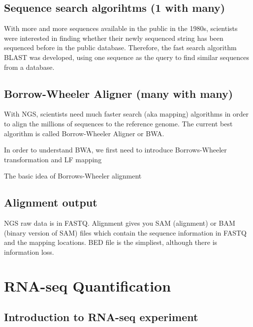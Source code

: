 \documentclass[
]{book}
\begin{document}
\hypertarget{sequence-search-algorihtms-1-with-many}{%
\section{Sequence search algorihtms (1 with many)}\label{sequence-search-algorihtms-1-with-many}}

With more and more sequences available in the public in the 1980s, scientists were interested in finding whether their newly sequenced string has been sequenced before in the public database. Therefore, the fast search algorithm BLAST was developed, using one sequence as the query to find similar sequences from a database.

\hypertarget{borrow-wheeler-aligner-many-with-many}{%
\section{Borrow-Wheeler Aligner (many with many)}\label{borrow-wheeler-aligner-many-with-many}}

With NGS, scientists need much faster search (aka mapping) algorithms in order to align the millions of sequences to the reference genome. The current best algorithm is called Borrow-Wheeler Aligner or BWA.

In order to understand BWA, we first need to introduce Borrows-Wheeler transformation and LF mapping

The basic idea of Borrows-Wheeler alignment

\hypertarget{alignment-output}{%
\section{Alignment output}\label{alignment-output}}

NGS raw data is in FASTQ. Alignment gives you SAM (alignment) or BAM (binary version of SAM) files which contain the sequence information in FASTQ and the mapping locations. BED file is the simpliest, although there is information loss.

\hypertarget{rnaseq}{%
\chapter{RNA-seq Quantification}\label{rnaseq}}

\hypertarget{introduction-to-rna-seq-experiment}{%
\section{Introduction to RNA-seq experiment}\label{introduction-to-rna-seq-experiment}}
\end{document}
